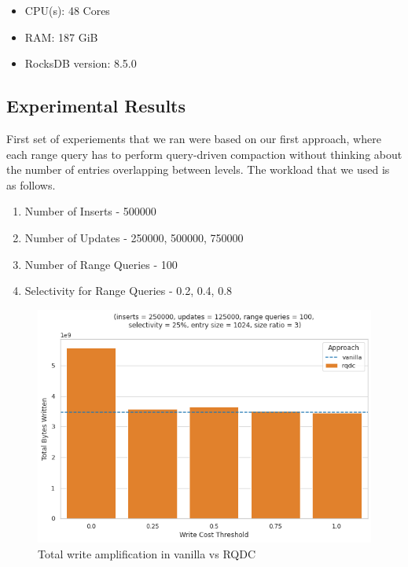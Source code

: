 \begin{itemize}
    \item CPU(s)\:: 48 Cores
    \item RAM\:: 187 GiB
    \item RocksDB version\:: 8.5.0
\end{itemize}

\subsection{Experimental Results}
First set of experiements that we ran were based on our first approach, where each range query has to 
perform query-driven compaction without thinking about the number of entries overlapping between levels. The workload that
we used is as follows.
\begin{enumerate}[leftmargin=*,labelindent=0mm, itemsep=0.2\baselineskip]
    \item Number of Inserts \-- 500000
    \item Number of Updates \-- 250000, 500000, 750000
    \item Number of Range Queries \-- 100 
    \item Selectivity for Range Queries \-- 0.2, 0.4, 0.8
\end{enumerate}

\begin{figure}
    \includegraphics[scale=0.33]{Figures/utl_ltu_approach.png}
    \caption{Total write amplification in vanilla vs RQDC}\label{fig:utl_ltu_approach}
\end{figure}

